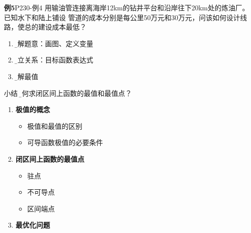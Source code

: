 \begin{frame}
	\linespread{1.2}
	\begin{exampleblock}{{\bf 例5}\hfill P230-例4}
		用输油管连接离海岸12km的钻井平台和沿岸往下20km处的炼油厂。已知水下和陆上铺设
		管道的成本分别是每公里50万元和30万元，问该如何设计线路，使总的建设成本最低？
	\end{exampleblock}\pause 
	{}\pause 
	\begin{enumerate}
	  \item {\b 理解题意：}画图、定义变量\pause 
	  \item {\b 建立关系：}目标函数表达式\pause 
	  \item {\b 求解最值}
	\end{enumerate}
\end{frame}


\begin{frame}[<+->]{小结}
	\linespread{1.2}
 	{}{\b 如何求闭区间上函数的最值和最值点？}\bigskip\pause
	\begin{enumerate}
	  \item {\bf 极值的概念}
	  \begin{itemize}
	    \item 极值和最值的区别
	    \item 可导函数极值的必要条件
	  \end{itemize}
	  \item {\bf 闭区间上函数的最值点}
	  \begin{itemize}
	    \item 驻点
	    \item 不可导点
	    \item 区间端点
	  \end{itemize}
	  \item {\bf 最优化问题}
	\end{enumerate}
\end{frame}